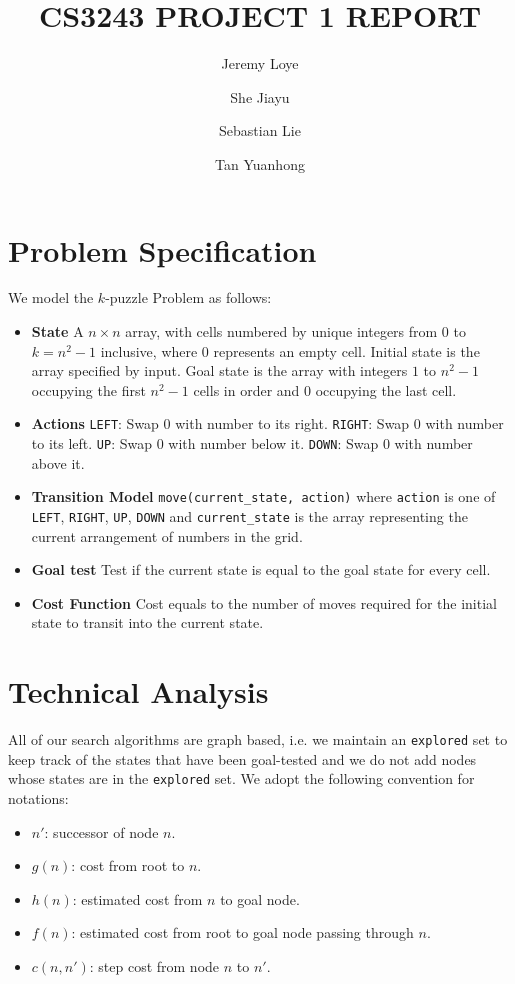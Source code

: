 \documentclass{llncs}
\begin{document}
\title{CS3243 PROJECT 1 REPORT}
\author{Jeremy Loye \and She Jiayu \and Sebastian Lie \and Tan Yuanhong}
\maketitle

\section{Problem Specification}
We model the $k$-puzzle Problem as follows:
\begin{itemize}
	\item[] \textbf{State}
		A $n \times n$ array, with cells numbered by unique integers from $0$ to $k = n ^ 2 - 1$ inclusive, where $0$ represents an empty cell. Initial state is the array specified by input. Goal state is the array with integers $1$ to $n ^ 2 - 1$ occupying the first $n^2 - 1$ cells in order and $0$ occupying the last cell.
	\item[] \textbf{Actions}
		\texttt{LEFT}: Swap $0$ with number to its right.  \texttt{RIGHT}: Swap $0$ with number to its left. \texttt{UP}: Swap $0$ with number below it. \texttt{DOWN}: Swap $0$ with number above it.
	\item[] \textbf{Transition Model}
		\texttt{move(current\_state, action)} where \texttt{action} is one of \texttt{LEFT}, \texttt{RIGHT}, \texttt{UP}, \texttt{DOWN} and \texttt{current\_state} is the array representing the current arrangement of numbers in the grid.
	\item[] \textbf{Goal test}
		Test if the current state is equal to the goal state for every cell.
	\item[] \textbf{Cost Function}
		Cost equals to the number of moves required for the initial state to transit into the current state.
\end{itemize}

\section{Technical Analysis}
All of our search algorithms are graph based, i.e. we maintain an \texttt{explored} set to keep track of the states that have been goal-tested and we do not add nodes whose states are in the \texttt{explored} set. We adopt the following convention for notations:
\begin{itemize}
    \item[] $n'$: successor of node $n$.
	\item[] $g(n)$: cost from root to $n$.
	\item[] $h(n)$: estimated cost from $n$ to goal node.
	\item[] $f(n)$: estimated cost from root to goal node passing through $n$.
	\item[] $c(n,n')$: step cost from node $n$ to $n'$.
\end{itemize}
\end{document}
